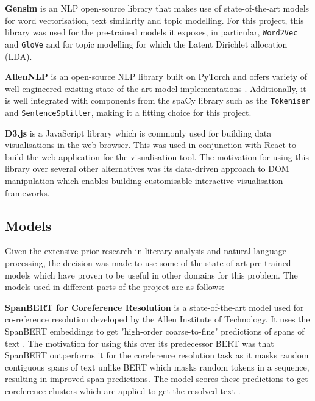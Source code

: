 \textbf{Gensim} is an NLP open-source library that makes use of state-of-the-art models for word vectorisation, text similarity and topic modelling. For this project, this library was used for the pre-trained models it exposes, in particular, \texttt{Word2Vec} and \texttt{GloVe} and for topic modelling for which the Latent Dirichlet allocation (LDA). 

\textbf{AllenNLP} is an open-source NLP library built on PyTorch and offers variety of well-engineered existing state-of-the-art model implementations \cite{allennlp}. Additionally, it is well integrated with components from the spaCy library such as the \texttt{Tokeniser} and \texttt{SentenceSplitter}, making it a fitting choice for this project. 

\textbf{D3.js} is a JavaScript library which is commonly used for building data visualisations in the web browser. This was used in conjunction with React to build the web application for the visualisation tool. The motivation for using this library over several other alternatives was its data-driven approach to DOM manipulation which enables building customisable interactive visualisation frameworks. 


\subsection{Models}

Given the extensive prior research in literary analysis and natural language processing, the decision was made to use some of the state-of-art pre-trained models which have proven to be useful in other domains for this problem. The models used in different parts of the project are as follows: 

\textbf{SpanBERT for Coreference Resolution} is a state-of-the-art model used for co-reference resolution developed by the Allen Institute of Technology. It uses the SpanBERT embeddings to get "high-order coarse-to-fine" predictions of spans of text \cite{spanBERT}. The motivation for using this over its predecessor BERT was that SpanBERT outperforms it for the coreference resolution task as it masks random contiguous spans of text unlike BERT which masks random tokens in a sequence, resulting in improved span predictions. The model scores these predictions to get coreference clusters which are applied to get the resolved text \cite{spanBERT}.

